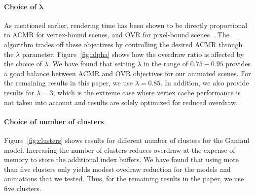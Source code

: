 
\paragraph{Choice of $\boldsymbol\lambda$} As mentioned earlier, rendering time has been shown to be
directly proportional to ACMR for vertex-bound scenes, and OVR for pixel-bound
scenes~\citep{Sander07}. The algorithm trades off these objectives by controlling the
desired ACMR through the $\lambda$ parameter. Figure~\ref{fig:alpha} shows how the overdraw ratio is affected by the choice
of $\lambda$. We have found that setting $\lambda$ in the range of $0.75-0.95$ provides a
good balance between ACMR and OVR objectives for our animated scenes. For the remaining results in this paper, we use $\lambda=0.85$.
In addition, we also provide results for $\lambda=3$, which is the
extreme case where vertex cache performance is not taken into account and results
are solely optimized for reduced overdraw.

\paragraph{Choice of number of clusters} Figure~\ref{fig:clusters} shows results for different number of clusters for the Ganfaul model.
Increasing the number of clusters reduces overdraw at the expense of memory to store the additional index
buffers. We have found that using more than five clusters only yields modest ovedraw reduction for the models and animations that we tested. Thus,
for the remaining results in the paper, we use five clusters.

